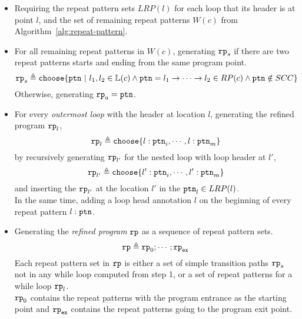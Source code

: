 \begin{itemize}
\item Requiring the repeat pattern sets $LRP(l)$ for each loop
that its header is at point $l$,
and the set of remaining repeat patterns $W(c)$ from Algorithm~\ref{alg:repeat-pattern}.
% 
\item For all remaining repeat patterns in $W(c)$, 
generating $\mathtt{rp}_{s}$ if there
are two repeat patterns starts and ending from the same program point.
\[
  \rprog_{s} \triangleq 
  \rpchoose{
  \rpattern ~|~ l_1, l_2 \in \lvar(c) \land 
  \rpattern = l_1 \to \cdots \to l_2 \in RP(c) 
  \land  \rpattern \notin SCC
    }
\]
Otherwise, generating $\mathtt{rp}_{a} = \mathtt{ptn}$.
%
\item 
For every \emph{outermost loop} with the header at location $l$, 
generating the refined program $\mathtt{rp}_l$,
\[
  \rprog_l \triangleq 
  \rpchoose{
   l: \rpattern_{i}, \cdots, l: \rpattern_{m}
  }
\]
by 
recursively generating $\mathtt{rp}_{l'}$ for the nested loop with loop header at $l'$,
\[
  \rprog_{l'} \triangleq 
\rpchoose{
 l': \rpattern_{i}, \cdots, l': \rpattern_{m}
}
\]
and inserting the $\mathtt{rp}_{l'}$ at the location $l'$ in the $\mathtt{ptn}_l \in LRP(l)$.
\\
In the same time, adding a loop head annotation $l$ on the beginning of every repeat pattern $l: \mathtt{ptn}$.
\item
Generating the \emph{refined program} $\mathtt{rp}$ as a sequence of repeat pattern sets.
%
\[
\mathtt{rp} \triangleq \mathtt{rp}_0; \cdots; \mathtt{rp}_{\mathtt{ex}}
\]
%
Each repeat pattern set in $\mathtt{rp}$ is either a set of simple transition paths $\mathtt{rp}_{s}$ not in any while loop computed from step 1,
or a set of repeat patterns for a while loop $\mathtt{rp}_l$.
\\
$\mathtt{rp}_0$ contains the repeat patterns with the program entrance as the starting point
and $\mathtt{rp}_{\mathtt{ex}}$ contains the repeat patterns going to the program exit point.
%
\end{itemize}
%

